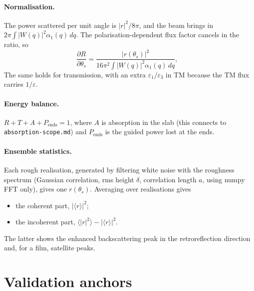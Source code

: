 \documentclass[11pt,a4paper]{article}
\begin{document}
\paragraph{Normalisation.} The power scattered per unit angle is $|r|^2/8\pi$, and the beam
brings in $2\pi\!\int|W(q)|^2\alpha_1(q)\,dq$. The polarisation-dependent flux factor
cancels in the ratio, so
\begin{equation}
 \frac{\partial R}{\partial\theta_s} = \frac{|r(\theta_s)|^2}{16\pi^2\int|W(q)|^2\alpha_1(q)\,dq},
\end{equation}
The same holds for transmission, with an extra $\varepsilon_1/\varepsilon_3$ in TM
because the TM flux carries $1/\varepsilon$.

\paragraph{Energy balance.} $R+T+A+P_{\text{ends}} = 1$, where $A$ is absorption in the slab
(this connects to \texttt{absorption-scope.md}) and $P_{\text{ends}}$ is the guided power lost at the ends.

\paragraph{Ensemble statistics.} Each rough realisation, generated by filtering white noise
with the roughness spectrum (Gaussian correlation, rms height $\delta$, correlation length $a$,
using numpy FFT only), gives one $r(\theta_s)$. Averaging over realisations gives
\begin{itemize}
  \item the coherent part, $|\langle r\rangle|^2$;
  \item the incoherent part, $\langle|r|^2\rangle-|\langle r\rangle|^2$.
\end{itemize}
The latter shows the enhanced backscattering peak in the retroreflection direction and,
for a film, satellite peaks.

\section{Validation anchors}
\end{document}
